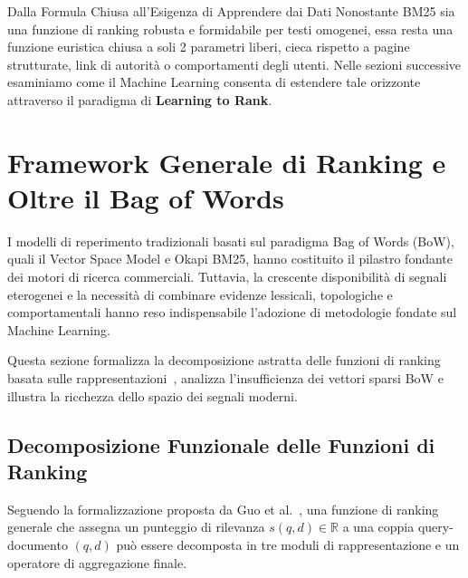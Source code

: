 \begin{noteblock}{Dalla Formula Chiusa all'Esigenza di Apprendere dai Dati}
Nonostante BM25 sia una funzione di ranking robusta e formidabile per testi omogenei, essa resta una funzione euristica chiusa a soli 2 parametri liberi, cieca rispetto a pagine strutturate, link di autorit\`a o comportamenti degli utenti. Nelle sezioni successive esaminiamo come il Machine Learning consenta di estendere tale orizzonte attraverso il paradigma di \textbf{Learning to Rank}.
\end{noteblock}



\FloatBarrier
\section{Framework Generale di Ranking e Oltre il Bag of Words}
\label{sec:ltr-intro-framework-generale}

I modelli di reperimento tradizionali basati sul paradigma Bag of Words (BoW), quali il Vector Space Model e Okapi BM25, hanno costituito il pilastro fondante dei motori di ricerca commerciali. Tuttavia, la crescente disponibilit\`a di segnali eterogenei e la necessit\`a di combinare evidenze lessicali, topologiche e comportamentali hanno reso indispensabile l'adozione di metodologie fondate sul Machine Learning.

Questa sezione formalizza la decomposizione astratta delle funzioni di ranking basata sulle rappresentazioni~\cite{guo2020,bruch2023}, analizza l'insufficienza dei vettori sparsi BoW e illustra la ricchezza dello spazio dei segnali moderni.

\FloatBarrier
\subsection{Decomposizione Funzionale delle Funzioni di Ranking}
\label{subsec:decomposizione-funzionale-ranking}

Seguendo la formalizzazione proposta da Guo et al.~\cite{guo2020}, una funzione di ranking generale che assegna un punteggio di rilevanza $s(q, d) \in \mathbb{R}$ a una coppia query-documento $(q, d)$ pu\`o essere decomposta in tre moduli di rappresentazione e un operatore di aggregazione finale.

